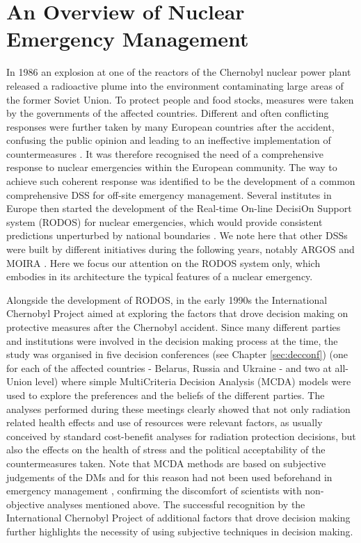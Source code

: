\section{An Overview of Nuclear Emergency Management}
\label{sec:nuclear}
In 1986 an explosion at one of the  reactors of the Chernobyl nuclear power plant released a radioactive plume into the environment contaminating large areas of the former Soviet Union. To protect people and food stocks, measures were taken by the governments of the affected countries. Different and often conflicting responses were further taken by many European countries after the accident, confusing the  public opinion and leading to an ineffective implementation of countermeasures \citep{Papamichail2013, Walle2008}. It was therefore recognised the need of a comprehensive response to nuclear emergencies within the European community. The way to achieve such coherent response was identified to be the development of a common comprehensive DSS for off-site emergency management. Several institutes in Europe then started the development of the Real-time On-line DecisiOn Support system (RODOS) for nuclear emergencies, which would provide consistent predictions unperturbed by national boundaries \citep{Ehrhardt1993}. We note here that other DSSs were built by different initiatives during the following years, notably ARGOS \citep{Hoe2003} and MOIRA \citep{Monte2009}. Here we focus our attention on the RODOS system only, which embodies in its architecture the typical features of a nuclear emergency. 

Alongside the development of RODOS, in the early 1990s the International Chernobyl Project aimed at exploring the factors that drove decision making on protective measures after the Chernobyl accident. Since many different parties and institutions were involved in the decision making process at the time, the study was organised in five decision conferences (see Chapter \ref{sec:decconf}) (one for each of the affected countries - Belarus, Russia and Ukraine - and two at all-Union level) where simple MultiCriteria Decision Analysis (MCDA) models were used to explore the preferences and the beliefs of the different parties. The analyses performed during these meetings clearly showed that not only radiation related health effects and use of resources were relevant factors, as usually conceived by standard cost-benefit analyses for radiation protection decisions, but also the effects on the health of stress and the political acceptability of the countermeasures taken. Note that MCDA methods are based on subjective judgements of the DMs and for this reason had not been used beforehand in emergency management \citep{Papamichail2013}, confirming the discomfort of scientists with non-objective analyses mentioned above. The successful recognition by the International Chernobyl Project of additional factors that drove decision making further highlights the necessity of using subjective techniques in decision making.

